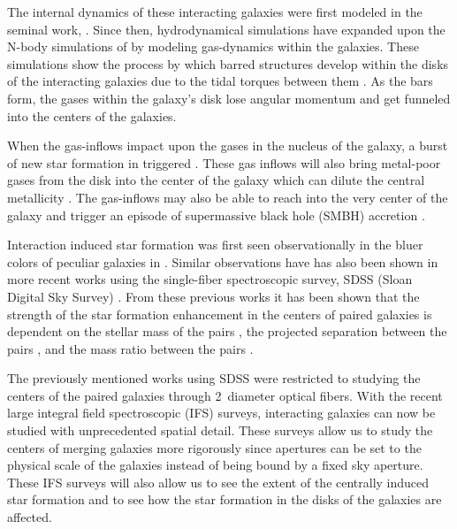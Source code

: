 \documentclass[iop,revtex4,twocolumn,apj,numberedappendix,appendixfloats]{emulateapj}
\begin{document}
The internal dynamics of these interacting galaxies were first modeled in the seminal work, \citet{Toomre:1972}. Since then, hydrodynamical simulations have expanded upon the N-body simulations of \citet{Toomre:1972} by modeling gas-dynamics within the galaxies. These simulations show the process by which barred structures develop within the disks of the interacting galaxies due to the tidal torques between them \citep{Barnes:1991}. As the bars form, the gases within the galaxy's disk lose angular momentum and get funneled into the centers of the galaxies. 

When the gas-inflows impact upon the gases in the nucleus of the galaxy, a burst of new star formation in triggered \citep{Barnes:1996, Mihos:1996}. These gas inflows will also bring metal-poor gases from the disk into the center of the galaxy which can dilute the central metallicity \citep{Rupke:2010, Perez:2011, Scudder:2012}. The gas-inflows may also be able to reach into the very center of the galaxy and trigger an episode of supermassive black hole (SMBH) accretion \citep{Capelo:2017}. 

Interaction induced star formation was first seen observationally in the bluer colors of peculiar galaxies in \citet{Larson:1978}. Similar observations have has also been shown in more recent works using the single-fiber spectroscopic survey, SDSS (Sloan Digital Sky Survey) \citep{Ellison:2008, Li:2008, Scudder:2012, Patton:2013, Bustamante:2020}. From these previous works it has been shown that the strength of the star formation enhancement in the centers of paired galaxies is dependent on the stellar mass of the pairs \citep{Li:2008}, the projected separation between the pairs \citep{Ellison:2008, Li:2008, Scudder:2012}, and the mass ratio between the pairs \citep{Ellison:2008}. 

The previously mentioned works using SDSS were restricted to studying the centers of the paired galaxies through 2\arcsec\ diameter optical fibers. With the recent large integral field spectroscopic (IFS) surveys, interacting galaxies can now be studied with unprecedented spatial detail. These surveys allow us to study the centers of merging galaxies more rigorously since apertures can be set to the physical scale of the galaxies instead of being bound by a fixed sky aperture. These IFS surveys will also allow us to see the extent of the centrally induced star formation and to see how the star formation in the disks of the galaxies are affected. 
\end{document}
